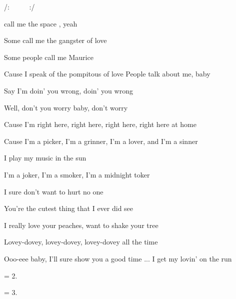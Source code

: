 
/:  ~  ~  ~  :/

\zs
{}  call me the space , yeah~ ~ 

Some call me the gangster of love

Some people call me Maurice

Cause I speak of the pompitous of love
\ks
\zs
People talk about me, baby

Say I'm doin' you wrong, doin' you wrong

Well, don't you worry baby, don't worry

Cause I'm right here, right here, right here, right here at home
\ks
\zr

Cause I'm a picker, I'm a grinner, I'm a lover, and I'm a sinner

I play my music in the sun
\bigskip

I'm a joker, I'm a smoker, I'm a midnight toker

I sure don't want to hurt no one
\kr

\zs
You're the cutest thing that I ever did see

I really love your peaches, want to shake your tree

Lovey-dovey, lovey-dovey, lovey-dovey all the time

Ooo-eee baby, I'll sure show you a good time
\ks
\zr
... I get my lovin' on the run
\kr

\zr\kr

\zs
= 2.
\ks

\zs
= 3.
\ks
\kp
